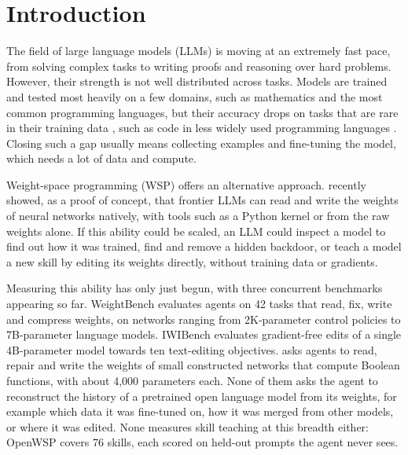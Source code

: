 \documentclass[11pt]{article}
\newcommand{\bench}{OpenWSP\xspace}
\begin{document}
\section{Introduction}\label{sec:intro}

The field of large language models (LLMs) is moving at an extremely fast pace, from solving complex tasks to writing proofs and reasoning over hard problems. However, their strength is not well distributed across tasks. Models are trained and tested most heavily on a
few domains, such as mathematics and the most common programming languages, but
their accuracy drops on tasks that are rare in their training data \citep{mccoy2024embers},
such as code in less widely used programming languages \citep{cassano2023multipl}. Closing
such a gap usually means collecting examples and fine-tuning the model, which needs a lot of data and
compute.

Weight-space programming (WSP) offers an alternative approach. \citet{takehi2026sparks} recently showed,
as a proof of concept, that frontier LLMs can read and write the weights of neural networks
natively, with tools such as a Python kernel or from the
raw weights alone. If this ability could be scaled, an LLM could inspect a model to find out how it
was trained, find and remove a hidden backdoor, or teach a model a new skill by editing its
weights directly, without training data or gradients.

Measuring this ability has only just begun, with three concurrent benchmarks appearing so far.
WeightBench \citep{marasini2026weightbench} evaluates agents on 42
tasks that read, fix, write and compress weights, on networks ranging from 2K-parameter
control policies to 7B-parameter language models. IWIBench \citep{vonCsefalvay2026iwibench}
evaluates gradient-free edits of a single 4B-parameter model towards ten text-editing
objectives. \citet{wspbench2026} asks
agents to read, repair and write the weights of small constructed networks that compute Boolean
functions, with about 4,000 parameters each. None of them asks the agent to reconstruct the history of a
pretrained open language model from its weights, for example which data it was fine-tuned on,
how it was merged from other models, or where it was edited. None measures skill teaching at
this breadth either: \bench covers 76 skills, each scored on held-out prompts the agent never
sees.
\end{document}
